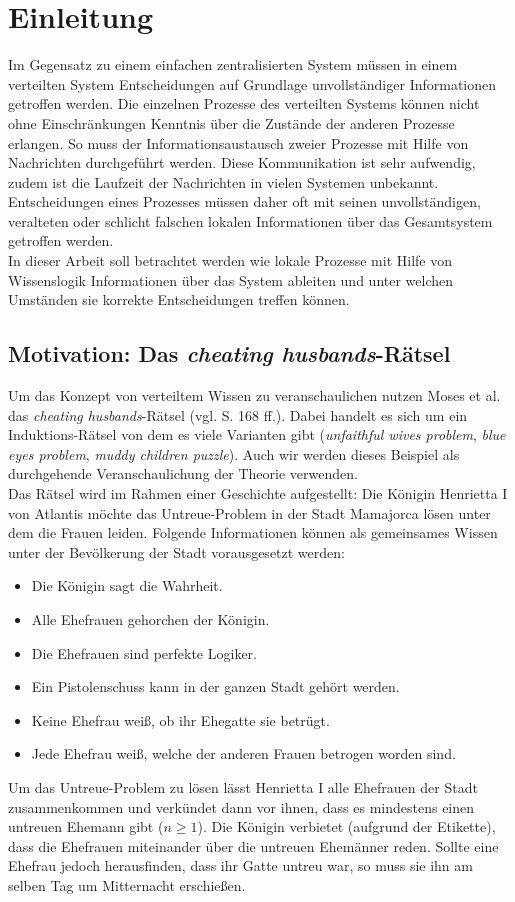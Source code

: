 \section{Einleitung}
Im Gegensatz zu einem einfachen zentralisierten System müssen in einem verteilten System Entscheidungen auf Grundlage unvollständiger Informationen getroffen werden.
Die einzelnen Prozesse des verteilten Systems können nicht ohne Einschränkungen Kenntnis über die Zustände der anderen Prozesse erlangen.
So muss der Informationsaustausch zweier Prozesse mit Hilfe von Nachrichten durchgeführt werden. Diese Kommunikation ist sehr aufwendig, zudem ist die Laufzeit der Nachrichten in vielen Systemen unbekannt.
Entscheidungen eines Prozesses müssen daher oft mit seinen unvollständigen, veralteten oder schlicht falschen lokalen Informationen über das Gesamtsystem getroffen werden.\\
In dieser Arbeit soll betrachtet werden wie lokale Prozesse mit Hilfe von Wissenslogik Informationen über das System ableiten und unter welchen Umständen sie korrekte Entscheidungen treffen können.

\subsection{Motivation: Das \textit{cheating husbands}-Rätsel}
\label{motivation}
Um das Konzept von verteiltem Wissen zu veranschaulichen nutzen Moses et al. \cite{moses1986cheating} das \textit{cheating husbands}-Rätsel (vgl. \cite{moses1986cheating} S. 168 ff.).
Dabei handelt es sich um ein Induktions-Rätsel von dem es viele Varianten gibt (\textit{unfaithful wives problem}, \textit{blue eyes problem}, \textit{muddy children puzzle}). Auch wir werden dieses Beispiel als durchgehende Veranschaulichung der Theorie verwenden.\\
Das Rätsel wird im Rahmen einer Geschichte aufgestellt: Die Königin Henrietta I von Atlantis möchte das Untreue-Problem in der Stadt Mamajorca lösen unter dem die Frauen leiden.
Folgende Informationen können als gemeinsames Wissen unter der Bevölkerung der Stadt vorausgesetzt werden:
\begin{itemize}
	\item Die Königin sagt die Wahrheit.
	\item Alle Ehefrauen gehorchen der Königin.
	\item Die Ehefrauen sind perfekte Logiker.
	\item Ein Pistolenschuss kann in der ganzen Stadt gehört werden.
	\item Keine Ehefrau weiß, ob ihr Ehegatte sie betrügt.
	\item Jede Ehefrau weiß, welche der anderen Frauen betrogen worden sind.
\end{itemize}
Um das Untreue-Problem zu lösen lässt Henrietta I alle Ehefrauen der Stadt zusammenkommen und verkündet dann vor ihnen, dass es mindestens einen untreuen Ehemann gibt ($n \ge 1$).
Die Königin verbietet (aufgrund der Etikette), dass die Ehefrauen miteinander über die untreuen Ehemänner reden.
Sollte eine Ehefrau jedoch herausfinden, dass ihr Gatte untreu war, so muss sie ihn am selben Tag um Mitternacht erschießen.\medskip

